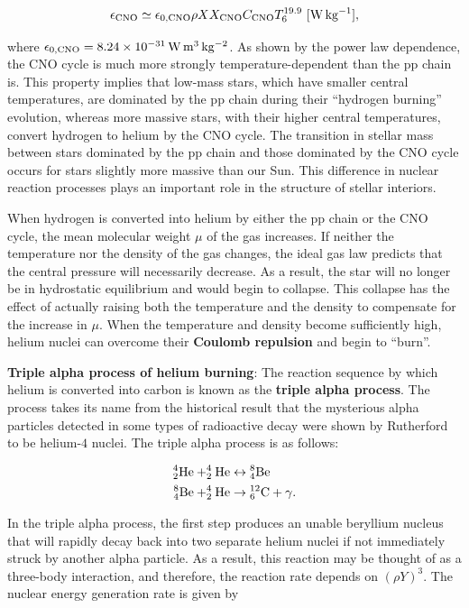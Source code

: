 \documentclass[a4paper,10pt]{article}
\begin{document}
\begin{align*}
    \epsilon_{\rm CNO} \simeq \epsilon_{\rm 0,CNO}\rho XX_{\rm CNO} C_{\rm CNO}T_6^{19.9} ~ [{\rm W\,kg^{-1}}],
\end{align*}

{\noindent}where $\epsilon_{\rm 0,CNO}=8.24\times10^{-31}\,{\rm W\,m^3\,kg^{-2}}$. As shown by the power law dependence, the CNO cycle is much more strongly temperature-dependent than the pp chain is. This property implies that low-mass stars, which have smaller central temperatures, are dominated by the pp chain during their ``hydrogen burning'' evolution, whereas more massive stars, with their higher central temperatures, convert hydrogen to helium by the CNO cycle. The transition in stellar mass between stars dominated by the pp chain and those dominated by the CNO cycle occurs for stars slightly more massive than our Sun. This difference in nuclear reaction processes plays an important role in the structure of stellar interiors. 

{\noindent}When hydrogen is converted into helium by either the pp chain or the CNO cycle, the mean molecular weight $\mu$ of the gas increases. If neither the temperature nor the density of the gas changes, the ideal gas law predicts that the central pressure will necessarily decrease. As a result, the star will no longer be in hydrostatic equilibrium and would begin to collapse. This collapse has the effect of actually raising both the temperature and the density to compensate for the increase in $\mu$. When the temperature and density become sufficiently high, helium nuclei can overcome their \textbf{Coulomb repulsion} and begin to ``burn''.

{\noindent}\textbf{Triple alpha process of helium burning}: The reaction sequence by which helium is converted into carbon is known as the \textbf{triple alpha process}. The process takes its name from the historical result that the mysterious alpha particles detected in some types of radioactive decay were shown by Rutherford to be helium-$4$ nuclei. The triple alpha process is as follows:

\begin{align*}
    {\rm ^4_2He + ^4_2He} &\leftrightarrow {\rm ^8_4Be} \\
    {\rm ^8_4Be + ^4_2He} &\rightarrow {\rm ^{12}_6C + \gamma}.
\end{align*}

{\noindent}In the triple alpha process, the first step produces an unable beryllium nucleus that will rapidly decay back into two separate helium nuclei if not immediately struck by another alpha particle. As a result, this reaction may be thought of as a three-body interaction, and therefore, the reaction rate depends on $(\rho Y)^3$. The nuclear energy generation rate is given by
\end{document}
